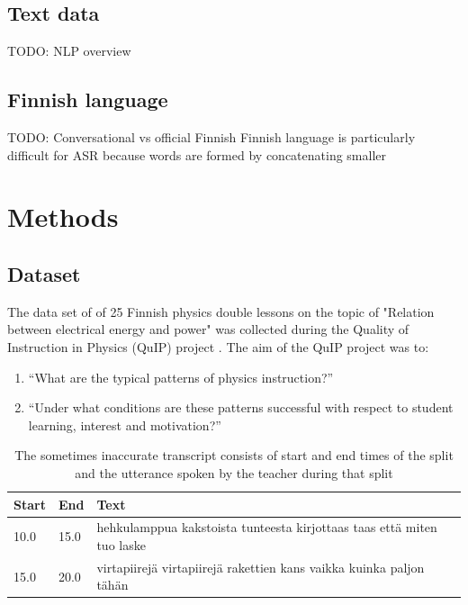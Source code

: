 \documentclass[utf8,english]{gradu3}
\begin{document}
\section{Text data}
TODO: NLP overview \parencite{silfverbergFinnPosOpensourceMorphological2016, kanervaTurkuNeuralParser2018}


\section{Finnish language}
TODO: Conversational vs official Finnish
Finnish language is particularly difficult for ASR because words are formed by concatenating smaller \parencite{enarviAutomaticSpeechRecognition2017}



\chapter{Methods}



\section{Dataset}
The data set of of 25 Finnish physics double lessons on the topic of "Relation between electrical energy and power" was collected during the Quality of Instruction in Physics (QuIP) project \parencite{fischerQualityInstructionPhysics2014, helaakoskiContentContentStructure2014}. The aim of the QuIP project was to:

\begin{enumerate}
  \item \enquote{What are the typical patterns of physics instruction?}
  \item \enquote{Under  what  conditions  are  these  patterns  successful  with  respect  to  student  learning, interest and motivation?}
\end{enumerate}

\begin{table}[]
  \label{table:transcript}
  \begin{tabular}{ | l | l | l |}
  \hline
  Start & End  & Text \\ \hline
  10.0 & 15.0 & hehkulamppua kakstoista tunteesta kirjottaas taas että miten tuo laske\\ \hline
  15.0 & 20.0 & virtapiirejä virtapiirejä rakettien kans vaikka kuinka paljon tähän\\
  \hline
  \end{tabular}
  \caption{The sometimes inaccurate transcript consists of start and end times of the split and the utterance spoken by the teacher during that split}
  \end{table}
\end{document}
